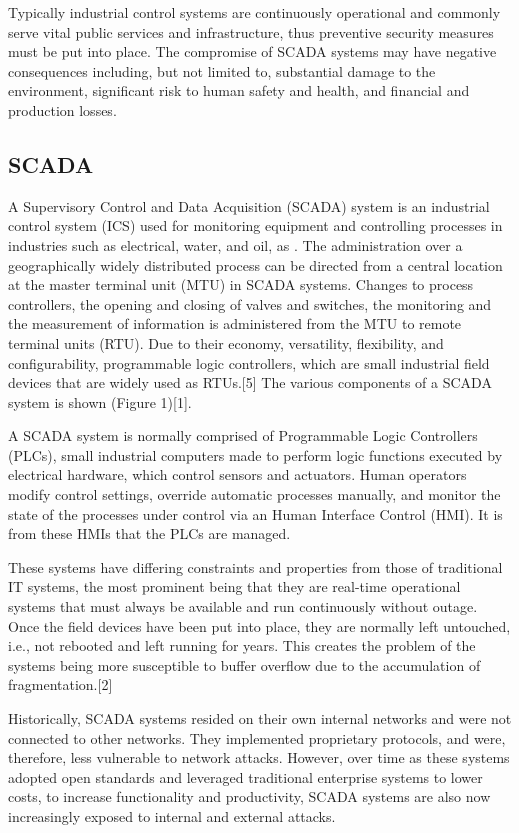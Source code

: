 \documentclass[12pt,]{article}
\begin{document}
Typically industrial control systems are continuously operational and
commonly serve vital public services and infrastructure, thus preventive
security measures must be put into place. The compromise of SCADA
systems may have negative consequences including, but not limited to,
substantial damage to the environment, significant risk to human safety
and health, and financial and production losses.

\subsection{SCADA}\label{scada}

A Supervisory Control and Data Acquisition (SCADA) system is an
industrial control system (ICS) used for monitoring equipment and
controlling processes in industries such as electrical, water, and oil,
as . The administration over a geographically widely distributed process
can be directed from a central location at the master terminal unit
(MTU) in SCADA systems. Changes to process controllers, the opening and
closing of valves and switches, the monitoring and the measurement of
information is administered from the MTU to remote terminal units (RTU).
Due to their economy, versatility, flexibility, and configurability,
programmable logic controllers, which are small industrial field devices
that are widely used as RTUs.{[}5{]} The various components of a SCADA
system is shown (Figure 1){[}1{]}.

A SCADA system is normally comprised of Programmable Logic Controllers
(PLCs), small industrial computers made to perform logic functions
executed by electrical hardware, which control sensors and actuators.
Human operators modify control settings, override automatic processes
manually, and monitor the state of the processes under control via an
Human Interface Control (HMI). It is from these HMIs that the PLCs are
managed.

These systems have differing constraints and properties from those of
traditional IT systems, the most prominent being that they are real-time
operational systems that must always be available and run continuously
without outage. Once the field devices have been put into place, they
are normally left untouched, i.e., not rebooted and left running for
years. This creates the problem of the systems being more susceptible to
buffer overflow due to the accumulation of fragmentation.{[}2{]}

Historically, SCADA systems resided on their own internal networks and
were not connected to other networks. They implemented proprietary
protocols, and were, therefore, less vulnerable to network attacks.
However, over time as these systems adopted open standards and leveraged
traditional enterprise systems to lower costs, to increase functionality
and productivity, SCADA systems are also now increasingly exposed to
internal and external attacks.
\end{document}
